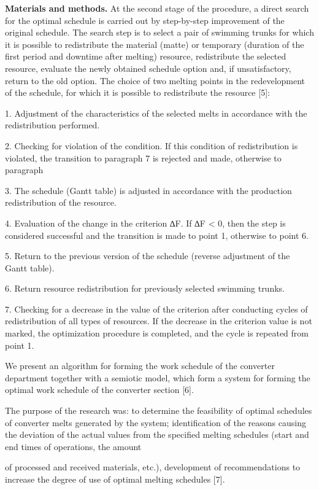 \textbf{Materials and methods.} At the second stage of the procedure, a
direct search for the optimal schedule is carried out by step-by-step
improvement of the original schedule. The search step is to select a
pair of swimming trunks for which it is possible to redistribute the
material (matte) or temporary (duration of the first period and downtime
after melting) resource, redistribute the selected resource, evaluate
the newly obtained schedule option and, if unsatisfactory, return to the
old option. The choice of two melting points in the redevelopment of the
schedule, for which it is possible to redistribute the resource {[}5{]}:

1. Adjustment of the characteristics of the selected melts in accordance
with the redistribution performed.

2. Checking for violation of the condition. If this condition of
redistribution is violated, the transition to paragraph 7 is rejected
and made, otherwise to paragraph

3. The schedule (Gantt table) is adjusted in accordance with the
production redistribution of the resource.

4. Evaluation of the change in the criterion ∆F. If ∆F \textless{} 0,
then the step is considered successful and the transition is made to
point 1, otherwise to point 6.

5. Return to the previous version of the schedule (reverse adjustment of
the Gantt table).

6. Return resource redistribution for previously selected swimming
trunks.

7. Checking for a decrease in the value of the criterion after
conducting cycles of redistribution of all types of resources. If the
decrease in the criterion value is not marked, the optimization
procedure is completed, and the cycle is repeated from point 1.

We present an algorithm for forming the work schedule of the converter
department together with a semiotic model, which form a system for
forming the optimal work schedule of the converter section {[}6{]}.

The purpose of the research was: to determine the feasibility of optimal
schedules of converter melts generated by the system; identification of
the reasons causing the deviation of the actual values from the
specified melting schedules (start and end times of operations, the
amount

of processed and received materials, etc.), development of
recommendations to increase the degree of use of optimal melting
schedules {[}7{]}.

